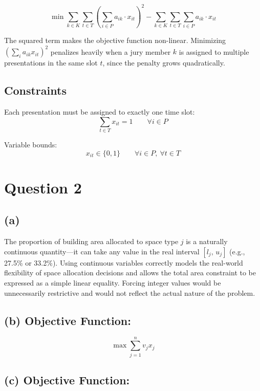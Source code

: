 \documentclass[12pt,a4paper]{article}
\begin{document}
\[
\min \sum_{k \in K} \sum_{t \in T}
\left( \sum_{i \in P} a_{ik} \cdot x_{it} \right)^2
- \sum_{k \in K} \sum_{t \in T} \sum_{i \in P} a_{ik} \cdot x_{it}
\]

The squared term makes the objective function non-linear. Minimizing $\left(\sum_i a_{ik} x_{it}\right)^2$ penalizes heavily when a jury member $k$ is assigned to multiple presentations in the same slot $t$, since the penalty grows quadratically.

\subsection*{Constraints}

Each presentation must be assigned to exactly one time slot:
\[
\sum_{t \in T} x_{it} = 1 \qquad \forall i \in P
\]

Variable bounds:
\[
x_{it} \in \{0, 1\} \qquad \forall i \in P,\ \forall t \in T
\]

\section*{Question 2}

\subsection*{(a)}

The proportion of building area allocated to space type $j$ is a naturally continuous quantity—it can take any value in the real interval $[l_j,\, u_j]$ (e.g., 27.5\% or 33.2\%). Using continuous variables correctly models the real-world flexibility of space allocation decisions and allows the total area constraint to be expressed as a simple linear equality. Forcing integer values would be unnecessarily restrictive and would not reflect the actual nature of the problem.

\subsection*{(b) Objective Function:}

\[
\max \sum_{j=1}^{n} v_j x_j
\]

\subsection*{(c) Objective Function:}
\end{document}
